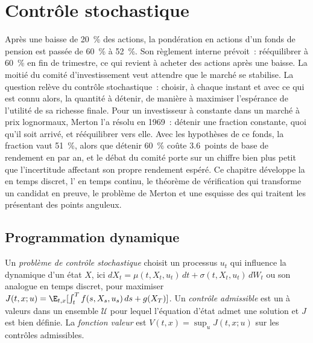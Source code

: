 \chapter{Contrôle stochastique}\label{ch:qm:stochastic-control}

Après une baisse de 20~\% des actions, la pondération en actions d'un fonds de pension est passée de 60~\% à 52~\%. Son
règlement interne prévoit~: rééquilibrer à 60~\% en fin de trimestre, ce qui revient à acheter des actions après une baisse. La moitié
du comité d'investissement veut attendre que le marché se stabilise. La question relève du contrôle
stochastique~: choisir, à chaque instant et avec ce qui est connu alors, la quantité à détenir, de manière à maximiser
l'espérance de l'utilité de sa richesse finale. Pour un investisseur à  constante dans un
marché à prix lognormaux, Merton l'a résolu en 1969~: détenir une fraction constante, quoi qu'il soit arrivé,
et rééquilibrer vers elle. Avec les hypothèses de ce fonds, la fraction vaut 51~\%, alors que détenir 60~\% coûte
3.6~points de base de rendement en  par an, et le débat du comité porte sur un chiffre
bien plus petit que l'incertitude affectant son propre rendement espéré. Ce chapitre développe la  en temps discret, l' en temps continu, le
théorème de vérification qui transforme un candidat en preuve, le problème de Merton et une esquisse des
 qui traitent les  présentant des points anguleux.

\section{Programmation dynamique}

\begin{definition}\label{def:qm:stochastic-control:problem}
Un \emph{problème de contrôle stochastique} choisit un processus $u_t$ qui
influence la dynamique d'un état $X$, ici $dX_t = \mu(t, X_t, u_t)\,dt + \sigma(t, X_t, u_t)\,dW_t$ ou son
analogue en temps discret, pour maximiser $J(t, x; u) = \E_{t,x}[\int_t^Tf(s, X_s, u_s)\,ds + g(X_T)]$. Un
\emph{contrôle admissible} est un  à valeurs dans un ensemble $\mathcal U$ pour
lequel l'équation d'état admet une solution et $J$ est bien définie. La \emph{fonction valeur}
est $V(t, x) = \sup_uJ(t, x; u)$ sur les contrôles admissibles.
\end{definition}

